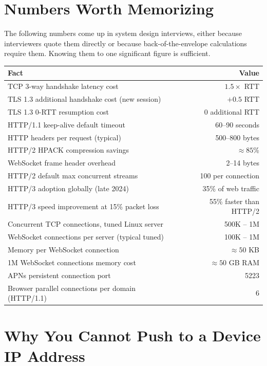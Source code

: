 \documentclass[11pt,a4paper]{article}
\begin{document}
\section{Numbers Worth Memorizing}

The following numbers come up in system design interviews, either because interviewers quote them directly or because back-of-the-envelope calculations require them. Knowing them to one significant figure is sufficient.

\begin{tabularx}{\linewidth}{Xr}
\toprule
\textbf{Fact} & \textbf{Value} \\
\midrule
TCP 3-way handshake latency cost & $1.5 \times$ RTT \\
TLS 1.3 additional handshake cost (new session) & $+0.5$ RTT \\
TLS 1.3 0-RTT resumption cost & $0$ additional RTT \\
HTTP/1.1 keep-alive default timeout & 60--90 seconds \\
HTTP headers per request (typical) & 500--800 bytes \\
HTTP/2 HPACK compression savings & $\approx 85$\% \\
WebSocket frame header overhead & 2--14 bytes \\
HTTP/2 default max concurrent streams & 100 per connection \\
HTTP/3 adoption globally (late 2024) & 35\% of web traffic \\
HTTP/3 speed improvement at 15\% packet loss & 55\% faster than HTTP/2 \\
Concurrent TCP connections, tuned Linux server & 500K -- 1M \\
WebSocket connections per server (typical tuned) & 100K -- 1M \\
Memory per WebSocket connection & $\approx 50$ KB \\
1M WebSocket connections memory cost & $\approx 50$ GB RAM \\
APNs persistent connection port & 5223 \\
Browser parallel connections per domain (HTTP/1.1) & 6 \\
\bottomrule
\end{tabularx}

\section{Why You Cannot Push to a Device IP Address}
\end{document}
